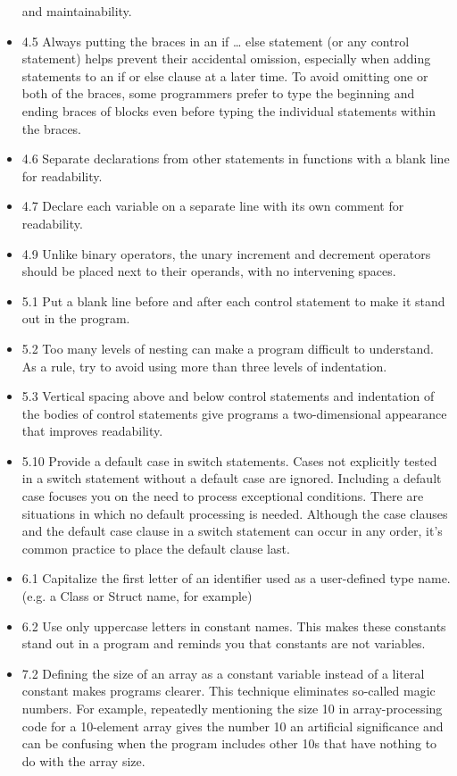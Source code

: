 \documentclass[11pt]{article}
\begin{document}
\begin{itemize}
and maintainability.
\item 4.5 Always putting the braces in an if \ldots{} else statement (or any
control statement) helps prevent their accidental omission,
especially when adding statements to an if or else clause at a later
time. To avoid omitting one or both of the braces, some programmers
prefer to type the beginning and ending braces of blocks even before
typing the individual statements within the braces.
\item 4.6 Separate declarations from other statements in functions with a
blank line for readability.
\item 4.7 Declare each variable on a separate line with its own comment
for readability.
\item 4.9 Unlike binary operators, the unary increment and decrement
operators should be placed next to their operands, with no
intervening spaces.
\item 5.1 Put a blank line before and after each control statement to make
it stand out in the program.
\item 5.2 Too many levels of nesting can make a program difficult to
understand. As a rule, try to avoid using more than three levels of
indentation.
\item 5.3 Vertical spacing above and below control statements and
indentation of the bodies of control statements give programs a
two-dimensional appearance that improves readability.
\item 5.10 Provide a default case in switch statements. Cases not
explicitly tested in a switch statement without a default case are
ignored. Including a default case focuses you on the need to process
exceptional conditions. There are situations in which no default
processing is needed. Although the case clauses and the default case
clause in a switch statement can occur in any order, it’s common
practice to place the default clause last.
\item 6.1 Capitalize the first letter of an identifier used as a
user-defined type name. (e.g. a Class or Struct name, for example)
\item 6.2 Use only uppercase letters in constant names. This makes these
constants stand out in a program and reminds you that constants are
not variables.
\item 7.2 Defining the size of an array as a constant variable instead of
a literal constant makes programs clearer. This technique eliminates
so-called magic numbers. For example, repeatedly mentioning the size
10 in array-processing code for a 10-element array gives the number
10 an artificial significance and can be confusing when the program
includes other 10s that have nothing to do with the array size.
\end{itemize}
\end{document}
